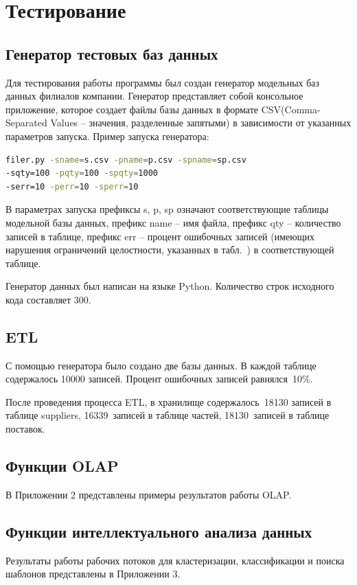 \section{Тестирование}

\subsection{Генератор тестовых баз данных}
Для тестирования работы программы был создан генератор модельных баз данных филиалов компании. Генератор представляет собой консольное приложение, которое создает файлы базы данных в формате CSV(Comma-Separated  Values – значения, разделенные запятыми) в зависимости от указанных параметров запуска. Пример запуска генератора: 
\begin{lstlisting}[language=bash]
filer.py -sname=s.csv -pname=p.csv -spname=sp.csv
-sqty=100 -pqty=100 -spqty=1000	
-serr=10 -perr=10 -sperr=10
\end{lstlisting}
В параметрах запуска префиксы s, p, sp означают соответствующие таблицы модельной базы данных, префикс name – имя файла, префикс qty – количество записей в таблице, префикс err – процент ошибочных записей (имеющих  нарушения  ограничений  целостности,  указанных  в табл.~) в соответствующей таблице.\par
Генератор данных был написан на языке Python. Количество строк исходного кода составляет 300.\par

\subsection{ETL}
С помощью генератора было создано две базы данных. В каждой таблице содержалось 10000 записей. Процент ошибочных записей равнялся~10\%.\par
После проведения процесса ETL, в хранилище содержалось~18130 записей в таблице suppliers, 16339~записей в таблице частей, 18130~записей в таблице поставок.

\subsection{Функции OLAP}
В Приложении 2 представлены примеры результатов работы OLAP.

\subsection{Функции интеллектуального анализа данных}
Результаты работы рабочих потоков для кластеризации, классификации и поиска шаблонов представлены в Приложении 3.

